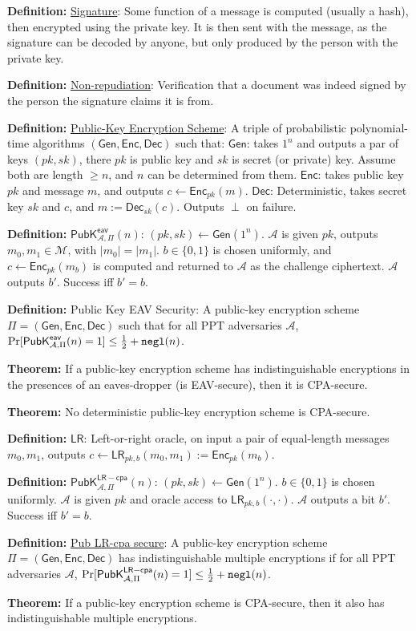 \documentclass[10pt]{article}
\newcommand{\AAA}{\mathcal{A}}
\newcommand{\MMM}{\mathcal{M}}
\newcommand{\LR}{\mathsf{LR}}
\newcommand{\defn}[1]{{\bf Definition:} \underline{#1}}
\newcommand{\thm}[1]{{\bf Theorem:} \underline{#1}}
\newcommand{\Enc}{\mathsf{Enc}}
\newcommand{\Dec}{\mathsf{Dec}}
\newcommand{\Gen}{\mathsf{Gen}}
\newcommand{\GenEncDec}{(\Gen,\Enc,\Dec)}
\newcommand{\ExptPubEavArgs}[2]{\mathsf{PubK}^{\mathsf{eav}}_{#1,#2}}
\newcommand{\ExptPubCpaArgs}[2]{\mathsf{PubK}^{\mathsf{LR-cpa}}_{#1,#2}}
\newcommand{\ExptPubEav}{\ExptPubEavArgs{\AAA}{\Pi}}
\newcommand{\ExptPubCpa}{\ExptPubCpaArgs{\AAA}{\Pi}}
\newcommand{\negl}{{\tt negl}}
\newcommand{\from}{\leftarrow}
\begin{document}
\begin{multicols}{3}
\defn{Signature}: Some function of a message is computed (usually a hash), then encrypted using the private key. It is then sent with the message, as the signature can be decoded by anyone, but only produced by the person with the private key.

\defn{Non-repudiation}: Verification that a document was indeed signed by the person the signature claims it is from.

\defn{Public-Key Encryption Scheme}: A triple of probabilistic polynomial-time algorithms $\GenEncDec$ such that: $\Gen$: takes $1^n$ and outputs a par of keys $(pk,sk)$, there $pk$ is public key and $sk$ is secret (or private) key. Assume both are length $\geq n$, and $n$ can be determined from them. $\Enc$: takes public key $pk$ and message $m$, and outputs $c\from\Enc_{pk}(m)$. $\Dec$: Deterministic, takes secret key $sk$ and $c$, and $m:=\Dec_{sk}(c)$. Outputs $\perp$ on failure.

\defn{$\ExptPubEav(n)$}: $(pk,sk)\from\Gen(1^n)$. $\AAA$ is given $pk$, outputs $m_0,m_1\in\MMM$, with $|m_0|=|m_1|$. $b\in\{0,1\}$ is chosen uniformly, and $c\from\Enc_{pk}(m_b)$ is computed and returned to $\AAA$ as the challenge ciphertext. $\AAA$ outputs $b'$. Success iff $b'=b$.

\defn{} Public Key EAV Security: A public-key encryption scheme $\Pi=\GenEncDec$ such that for all PPT adversaries $\AAA$, $\Pr[\ExptPubEav(n)=1]\leq\frac{1}{2}+\negl(n)$.

\thm{} If a public-key encryption scheme has indistinguishable encryptions in the presences of an eaves-dropper (is EAV-secure), then it is CPA-secure.

\thm{}No deterministic public-key encryption scheme is CPA-secure.

\defn{$\LR$}: Left-or-right oracle, on input a pair of equal-length messages $m_0,m_1$, outputs $c\from\LR_{pk,b}(m_0,m_1):=\Enc_{pk}(m_b)$.

\defn{$\ExptPubCpa(n)$}: $(pk,sk)\from\Gen(1^n)$. $b\in\{0,1\}$ is chosen uniformly. $\AAA$ is given $pk$ and oracle access to $\LR_{pk,b}(\cdot,\cdot)$. $\AAA$ outputs a bit $b'$. Success iff $b'=b$.

\defn{Pub LR-cpa secure}: A public-key encryption scheme $\Pi=\GenEncDec$ has indistinguishable multiple encryptions if for all PPT adversaries $\AAA$, $\Pr[\ExptPubCpa(n)=1]\leq\frac{1}{2}+\negl(n)$.

\thm{}If a public-key encryption scheme is CPA-secure, then it also has indistinguishable multiple encryptions.


\end{multicols}
\end{document}
